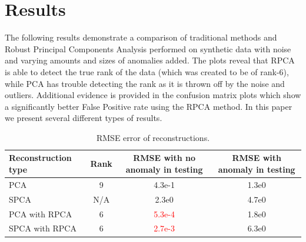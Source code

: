 \documentclass[conference]{IEEEtran}
\begin{document}
\section{Results}
The following results demonstrate a comparison of traditional methods and Robust Principal Components Analysis performed on synthetic data with noise and varying amounts and sizes of anomalies added.  The plots reveal that RPCA is able to detect the true rank of the data (which was created to be of rank-6), while PCA has trouble detecting the rank as it is thrown off by the noise and outliers.  Additional evidence is provided in the confusion matrix plots which show a significantly better False Positive rate using the RPCA method.
In this paper we present several different types of results. 

\begin{table}[h!]
    \begin{center}
      \caption{RMSE error of reconstructions.}
      \label{tab:table1}
      \begin{tabular}{l|c|c|c} %
        \textbf{Reconstruction type} & Rank & \begin{minipage}{1in}\textbf{RMSE with no anomaly in testing}\end{minipage} & \begin{minipage}{1in}\textbf{RMSE with anomaly in testing}\end{minipage}\\
        \hline
        PCA & 9 & 4.3e-1 & 1.3e0\\
        SPCA & N/A & 2.3e0 & 4.7e0 \\
        PCA with RPCA & 6 & \textcolor{red}{5.3e-4} & 1.8e0  \\
        SPCA with RPCA & 6 & \textcolor{red}{2.7e-3} & 6.3e0 \\
      \end{tabular}
    \end{center}
\end{table}
\end{document}
